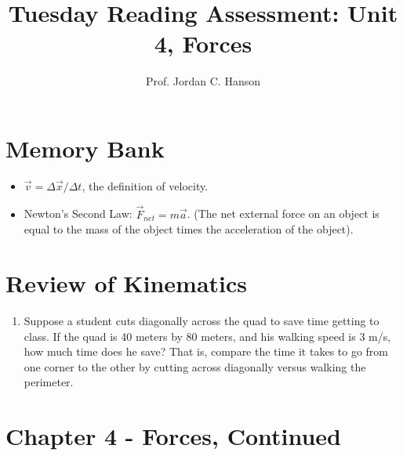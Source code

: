 \documentclass{article}
\begin{document}
\title{Tuesday Reading Assessment: Unit 4, Forces}
\author{Prof. Jordan C. Hanson}

\maketitle

\section{Memory Bank}

\begin{itemize}
\item $\vec{v} = \Delta \vec{x} / \Delta t$, the definition of velocity.
\item Newton's Second Law: $\vec{F}_{net} = m\vec{a}$. (The net external force on an object is equal to the mass of the object times the acceleration of the object).
\end{itemize}

\section{Review of Kinematics}

\begin{enumerate}
\item Suppose a student cuts diagonally across the quad to save time getting to class.  If the quad is 40 meters by 80 meters, and his walking speed is 3 m/s, how much time does he save?  That is, compare the time it takes to go from one corner to the other by cutting across diagonally versus walking the perimeter. \\ \vspace{1.5cm}
\end{enumerate}

\section{Chapter 4 - Forces, Continued}
\end{document}

